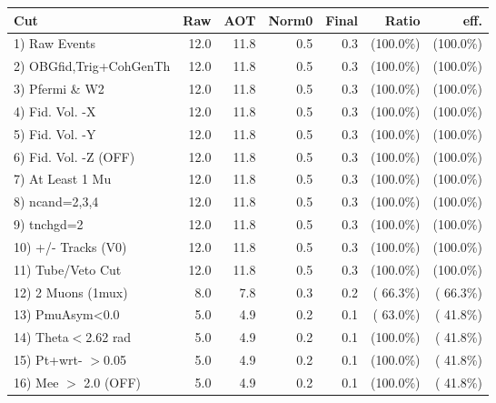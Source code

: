  \begin{table}[h!]\centering
 \begin{tabular}{||l||r|r|r|r|r|r||}
 \hline
 \hline
 Cut & Raw & AOT & Norm0 & Final & Ratio & eff.       \\
 \hline
  1) Raw Events           &         12.0 &         11.8 &          0.5 &          0.3 & (100.0\%) & (100.0\%) \\
  2) OBGfid,Trig+CohGenTh &         12.0 &         11.8 &          0.5 &          0.3 & (100.0\%) & (100.0\%) \\
  3) Pfermi \& W2         &         12.0 &         11.8 &          0.5 &          0.3 & (100.0\%) & (100.0\%) \\
  4) Fid. Vol. -X         &         12.0 &         11.8 &          0.5 &          0.3 & (100.0\%) & (100.0\%) \\
  5) Fid. Vol. -Y         &         12.0 &         11.8 &          0.5 &          0.3 & (100.0\%) & (100.0\%) \\
  6) Fid. Vol. -Z (OFF)   &         12.0 &         11.8 &          0.5 &          0.3 & (100.0\%) & (100.0\%) \\
  7) At Least 1 Mu        &         12.0 &         11.8 &          0.5 &          0.3 & (100.0\%) & (100.0\%) \\
  8) ncand=2,3,4          &         12.0 &         11.8 &          0.5 &          0.3 & (100.0\%) & (100.0\%) \\
  9) tnchgd=2             &         12.0 &         11.8 &          0.5 &          0.3 & (100.0\%) & (100.0\%) \\
 10) +/- Tracks (V0)      &         12.0 &         11.8 &          0.5 &          0.3 & (100.0\%) & (100.0\%) \\
 11) Tube/Veto Cut        &         12.0 &         11.8 &          0.5 &          0.3 & (100.0\%) & (100.0\%) \\
 12) 2 Muons (1mux)       &          8.0 &          7.8 &          0.3 &          0.2 & ( 66.3\%) & ( 66.3\%) \\
 13) PmuAsym<0.0          &          5.0 &          4.9 &          0.2 &          0.1 & ( 63.0\%) & ( 41.8\%) \\
 14) Theta$<$2.62 rad     &          5.0 &          4.9 &          0.2 &          0.1 & (100.0\%) & ( 41.8\%) \\
 15) Pt+wrt- $>$0.05      &          5.0 &          4.9 &          0.2 &          0.1 & (100.0\%) & ( 41.8\%) \\
 16) Mee $>$ 2.0  (OFF)   &          5.0 &          4.9 &          0.2 &          0.1 & (100.0\%) & ( 41.8\%) \\

\end{tabular}
\end{table}
